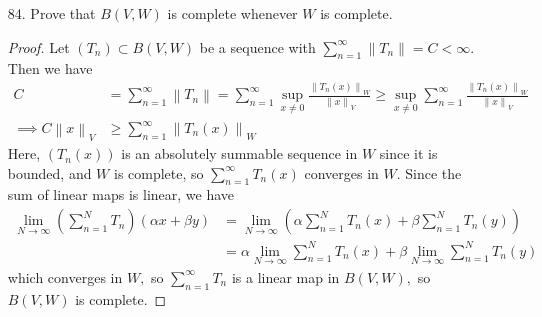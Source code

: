 \documentclass{article}
\begin{document}
\begin{itemize}
	\item[84.] Prove that $B(V, W)$ is complete whenever $W$ is complete.
		\begin{proof}
			Let $(T_n)\subset B(V, W)$ be a sequence with $\sum_{n=1}^{\infty} \left\lVert T_n \right\rVert = C<\infty.$ Then we have
			\begin{align*}
				C &= \sum_{n=1}^{\infty} \left\lVert T_n \right\rVert = \sum_{n=1}^{\infty} \sup_{x\neq 0}\frac{\left\lVert T_n(x) \right\rVert_W}{\left\lVert x \right\rVert_V} \ge \sup_{x\neq 0} \sum_{n=1}^{\infty} \frac{\left\lVert T_n(x) \right\rVert_W}{\left\lVert x \right\rVert_V} \\
				\implies C\left\lVert x \right\rVert_V &\ge \sum_{n=1}^{\infty} \left\lVert T_n(x) \right\rVert_W
			\end{align*}
			Here, $(T_n(x))$ is an absolutely summable sequence in $W$ since it is bounded, and $W$ is complete, so $\sum_{n=1}^{\infty} T_n(x)$ converges in $W.$ Since the sum of linear maps is linear, we have
			\begin{align*}
				\lim_{N\to\infty} \left( \sum_{n=1}^{N} T_n \right)(\alpha x + \beta y) &= \lim_{N\to\infty} \left( \alpha\sum_{n=1}^{N} T_n(x) + \beta \sum_{n=1}^{N} T_n(y) \right) \\
				&= \alpha \lim_{N\to\infty} \sum_{n=1}^{N} T_n(x) + \beta \lim_{N\to\infty} \sum_{n=1}^{N} T_n(y)
			\end{align*}
			which converges in $W,$ so $\sum_{n=1}^{\infty} T_n$ is a linear map in $B(V, W),$ so $B(V, W)$ is complete.
		\end{proof}
		
\end{itemize}
\end{document}
